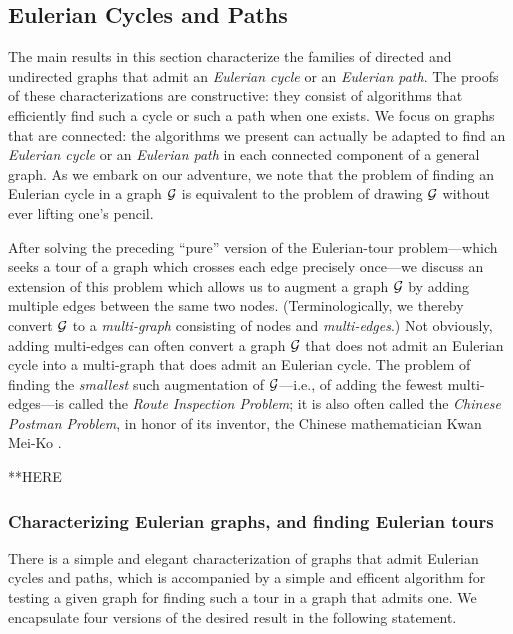 
\subsection{Eulerian Cycles and Paths}
\label{sec:EulerianCycle}

The main results in this section characterize the families of directed
and undirected graphs that admit an {\it Eulerian cycle} or an {\it
  Eulerian path}.  The proofs of these characterizations are
constructive: they consist of algorithms that efficiently find such a
cycle or such a path when one exists.  We focus on graphs that are
connected: the algorithms we present can actually be adapted to find
an {\it Eulerian cycle} or an {\it Eulerian path} in each connected
component of a general graph.  As we embark on our adventure, we note
that the problem of finding an Eulerian cycle in a graph $\mbox{$\cal G$}$ is
equivalent to the problem of drawing $\mbox{$\cal G$}$ without ever lifting one's
pencil. 

After solving the preceding ``pure'' version of the Eulerian-tour
problem---which seeks a tour of a graph which crosses each edge
precisely once---we discuss an extension of this problem which allows
us to augment a graph $\mbox{$\cal G$}$ by adding multiple edges between the same
two nodes.  (Terminologically, we thereby convert $\mbox{$\cal G$}$ to a {\it
  multi-graph}  
consisting of nodes and {\it multi-edges}.)  Not
obviously, adding multi-edges can often convert a graph $\mbox{$\cal G$}$ that does
not admit an Eulerian cycle into a multi-graph that does admit an
Eulerian cycle.  The problem of finding the {\em smallest} such
augmentation of $\mbox{$\cal G$}$---i.e., of adding the fewest multi-edges---is
called the  {\it Route Inspection
  Problem}; it is also often called the {\it Chinese Postman Problem},
 in honor of its inventor, the Chinese
mathematician Kwan Mei-Ko  \cite{Kwan60}.

**HERE

\subsubsection{Characterizing Eulerian graphs, and finding Eulerian tours}
\label{sec:eulerian-cycle-path}

There is a simple and elegant characterization of graphs that admit
Eulerian cycles and paths, which is accompanied by a simple and
efficent algorithm for testing a given graph for finding such a tour
in a graph that admits one.  We encapsulate four versions of the
desired result in the following statement.

